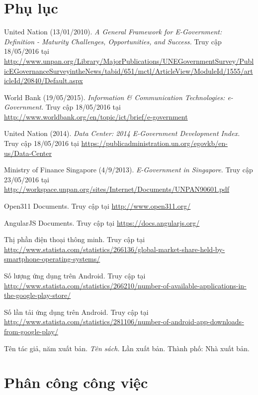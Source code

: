 \documentclass[a4paper]{article}
\begin{document}
\section{Phụ lục}
\begin{thebibliography}{99}
United Nation (13/01/2010). \textit{A General Framework for E-Government: Definition - Maturity Challenges, Opportunities, and Success.} Truy cập 18/05/2016 tại \url{http://www.unpan.org/Library/MajorPublications/UNEGovernmentSurvey/PublicEGovernanceSurveyintheNews/tabid/651/mctl/ArticleView/ModuleId/1555/articleId/20840/Default.aspx}

World Bank (19/05/2015). \textit{Information \& Communication Technologies: e-Government.} Truy cập 18/05/2016 tại \url{http://www.worldbank.org/en/topic/ict/brief/e-government}

United Nation (2014). \textit{Data Center: 2014 E-Government Development Index.} Truy cập 18/05/2016 tại \url{https://publicadministration.un.org/egovkb/en-us/Data-Center}

Ministry of Finance Singapore (4/9/2013). \textit{E-Government in Singapore.} Truy cập 23/05/2016 tại \url{http://workspace.unpan.org/sites/Internet/Documents/UNPAN90601.pdf}

Open311 Documents. Truy cập tại
 \url{http://www.open311.org/} 
 
AngularJS Documents. Truy cập tại
 \url{https://docs.angularjs.org/} 
 
Thị phần điện thoại thông minh. Truy cập tại
 \url{http://www.statista.com/statistics/266136/global-market-share-held-by-smartphone-operating-systems/} 

Số lượng ứng dụng trên Android. Truy cập tại
 \url{http://www.statista.com/statistics/266210/number-of-available-applications-in-the-google-play-store/}
 
Số lần tải ứng dụng trên Android. Truy cập tại
 \url{http://www.statista.com/statistics/281106/number-of-android-app-downloads-from-google-play/}
 
\bibitem{}
Tên tác giả, năm xuất bản. \textit{Tên sách.} Lần xuất bản. Thành phố: Nhà xuất bản.


\end{thebibliography}

\newpage
\section*{Phân công công việc}
\end{document}
